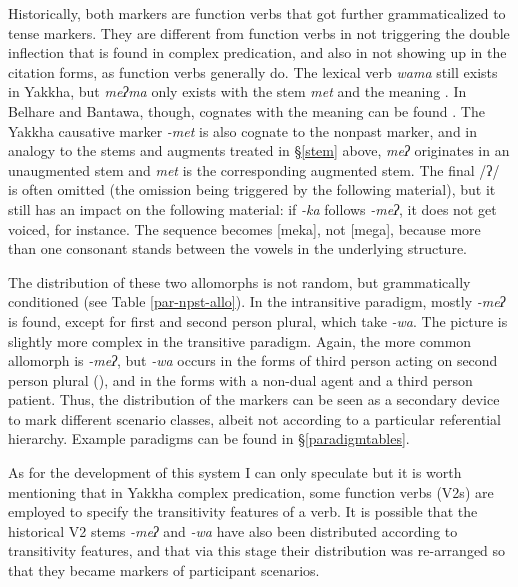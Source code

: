 Historically, both markers are function verbs that got further grammaticalized to tense markers. They are different from function verbs in not triggering the double inflection that is found in complex predication, and also in not showing up in the citation forms, as function verbs generally do. The lexical verb \emph{wama}  still exists in Yakkha, but \emph{meʔma} only exists with the stem \emph{met} and the meaning . In Belhare and Bantawa, though, cognates with the meaning  can be found  \citep{Bickel1997Dictionary, Doornenbal2009A-grammar}. The Yakkha causative marker \emph{-met} is also cognate to the nonpast marker, and in analogy to the stems and augments treated in §\ref{stem} above,  \emph{meʔ} originates in an unaugmented stem and \emph{met} is the corresponding augmented stem. The final /ʔ/ is often omitted (the omission being triggered by the following material), but it still has an impact on the following material: if \emph{-ka} follows \emph{-meʔ}, it does not get voiced, for instance. The sequence becomes [meka], not [mega], because more than one consonant stands between the vowels  in the underlying structure.


The distribution of these two allomorphs is not random, but grammatically conditioned (see Table \ref{par-npst-allo}). In the intransitive paradigm, mostly \emph{-meʔ} is found, except for first and second person plural, which take \emph{-wa}. The picture is slightly more complex in the transitive paradigm. Again, the more common allomorph is \emph{-meʔ}, but \emph{-wa} occurs in the forms of third person acting on second person plural (), and in the forms with a non-dual agent and a third person patient. Thus, the distribution of the markers can be seen as  a secondary device to mark different scenario classes, albeit not according to a particular referential hierarchy.  Example paradigms can be found in §\ref{paradigmtables}. 

As for the development of this system I can only speculate but it is worth mentioning that in Yakkha complex predication, some function verbs (V2s) are employed to specify the transitivity features of a verb. It is possible that the historical V2 stems \emph{-meʔ} and \emph{-wa} have also been distributed according to transitivity features, and that via this stage their distribution was re-arranged so that they became markers of participant scenarios.


